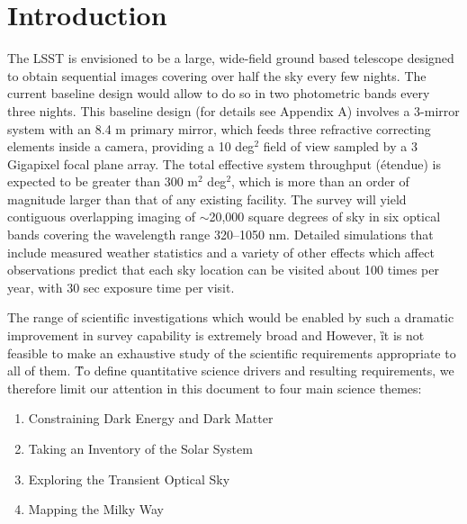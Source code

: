 \section{Introduction}


The LSST is envisioned to be a large, wide-field ground based telescope
designed to obtain sequential images covering over half the sky every few nights.
The current baseline design would allow to do so in two photometric bands every three
nights. This baseline design (for details see Appendix A) involves a 3-mirror system with an
8.4 m primary mirror, which feeds three refractive correcting elements inside a camera,
providing a 10 deg$^2$ field of view sampled by a 3 Gigapixel focal plane array.
The total effective system throughput (\'etendue) is expected to be greater than
300 m$^2$ deg$^2$,
which is more than an order of magnitude larger than that of any existing facility.
The survey will yield contiguous overlapping imaging of $\sim$20,000 square degrees
of sky in six optical bands covering the wavelength range 320--1050 nm.
Detailed simulations that include measured weather statistics and a variety
of other effects which affect observations predict that each sky location can be
visited about 100 times per year, with 30 sec exposure time per visit.

The range of scientific investigations which would be enabled by such a
dramatic improvement in survey capability is extremely broad and
  However,  \G{it is not} feasible to make an exhaustive study of the scientific requirements
appropriate to all of them. \G{To define quantitative science drivers and resulting requirements,}
we therefore limit our attention in this document to four
main science themes:
\begin{enumerate}
\item Constraining Dark Energy and Dark Matter
\item Taking an Inventory of the Solar System
\item Exploring the Transient Optical Sky
\item Mapping the Milky Way
\end{enumerate}

